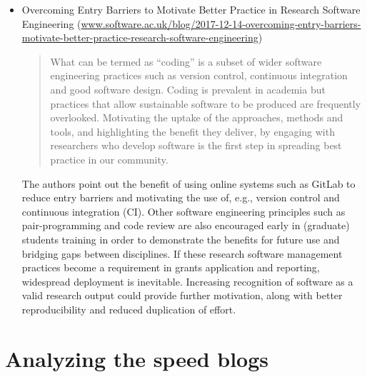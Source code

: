 \documentclass[11pt,letterpaper]{article}
\newcommand{\katznote}[1]{ {\textcolor{magenta}    { ***Dan: #1 }}}
\newcommand{\sdnote}[1]{ {\textcolor{darkgreen}    { ***Stephan: #1 }}}
\begin{document}
\begin{itemize}
\item Overcoming Entry Barriers to Motivate Better Practice in Research Software Engineering (\href{https://www.software.ac.uk/blog/2017-12-14-overcoming-entry-barriers-motivate-better-practice-research-software-engineering}{www.software.ac.uk/blog/2017-12-14-overcoming-entry-barriers-motivate-better-practice-research-software-engineering})
\begin{quote}
What can be termed as ``coding'' is a subset of wider software engineering practices such as version control, continuous integration and good software design. Coding is prevalent in academia but practices that allow sustainable software to be produced are frequently overlooked.  Motivating the uptake of the approaches, methods and tools, and highlighting the benefit they deliver, by engaging with researchers who develop software is the first step in spreading best practice in our community.
\end{quote}
The authors point out the benefit of using online systems such as GitLab to reduce entry barriers and motivating the use of, e.g., version control and continuous integration (CI). Other software engineering principles such as pair-programming and code review are also encouraged early in (graduate) students training in order to demonstrate the benefits for future use and bridging gaps between disciplines. If these research software management practices become a requirement in grants application and reporting, widespread deployment is inevitable. Increasing recognition of software as a valid research output could provide further motivation, along with better reproducibility and reduced duplication of effort.

\end{itemize}


\section{Analyzing the speed blogs} \label{sec:speed_blog_analysis}


\end{document}
